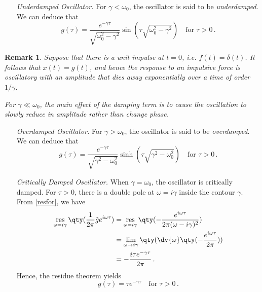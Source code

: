 \documentclass{article}
\theoremstyle{plain}\theoremheaderfont{\normalfont\itshape}\theorembodyfont{\rmfamily}\theoremseparator{.}\newtheorem*{rem}{Remark}\newtheorem*{ex}{Example}\newtheorem*{proof}{Proof}\newtheorem*{altp}{Alternative proof}
\theoremstyle{plain}\theoremheaderfont{\normalfont\bfseries}\theorembodyfont{\rmfamily}\theoremseparator{.}\newtheorem{thm}{Theorem}[section]\newtheorem{lem}[thm]{Lemma}\newtheorem{prop}[thm]{Proposition}\newtheorem*{cor}{Corollary}\newtheorem{defn}[thm]{Definition}\newtheorem{clm}[thm]{Claim}\newtheorem{clminproof}{Claim}
\theoremstyle{break}\theoremheaderfont{\normalfont\itshape}\theorembodyfont{\rmfamily}\theoremseparator{.\medskip}\newtheorem*{proofskip}{Proof}\newtheorem*{exs}{Examples}\newtheorem*{rems}{Remarks}
\theoremstyle{break}\theoremheaderfont{\normalfont\bfseries}\theorembodyfont{\rmfamily}\theoremseparator{.\medskip}\newtheorem{lemskip}[thm]{Lemma}\newtheorem{defnskip}[thm]{Definition}\newtheorem{propskip}[thm]{Proposition}\newtheorem{thmskip}[thm]{Theorem}
\numberwithin{equation}{section}
\DeclareMathOperator*{\res}{res}
\begin{document}
	\begin{itemize}[topsep=0pt,leftmargin=30pt,itemindent=82pt]
		\item[\textit{Underdamped Oscillator.}] For \(\gamma<\omega_0\), the oscillator is said to be \textit{underdamped}. We can deduce that
		\[g(\tau)=\frac{e^{-\gamma\tau}}{\sqrt{\omega_0^2-\gamma^2}}\sin(\tau\sqrt{\omega_0^2-\gamma^2})\quad\text{for }\tau>0\,.\]
	\end{itemize}
	\begin{rem}
		Suppose that there is a unit impulse at \(t=0\), i.e. \(f(t)=\delta(t)\). It follows that \(x(t)=g(t)\), and hence the response to an impulsive force is oscillatory with an amplitude that dies away exponentially over a time of order \(1/\gamma\).

		For \(\gamma\ll \omega_0\), the main effect of the damping term is to cause the oscillation to slowly reduce in amplitude rather than change phase.
	\end{rem}
	\begin{itemize}[topsep=0pt,leftmargin=30pt,itemindent=77pt]
		\item[\textit{Overdamped Oscillator.}] For \(\gamma>\omega_0\), the oscillator is said to be \textit{overdamped}. We can deduce that
		\[g(\tau)=\frac{e^{-\gamma\tau}}{\sqrt{\gamma^2-\omega_0^2}}\sinh(\tau\sqrt{\gamma^2-\omega_0^2})\quad\text{for }\tau>0\,.\]
	\end{itemize}
	\begin{itemize}[topsep=0pt,leftmargin=30pt,itemindent=103pt]
		\item[\textit{Critically Damped Oscillator.}] When \(\gamma=\omega_0\), the oscillator is critically damped. For \(\tau>0\), there is a double pole at \(\omega=i\gamma\) inside the contour \(\gamma\). From \cref{resfor}, we have
		\begin{align*}
			\res_{\omega=i\gamma}\qty(\frac{1}{2\pi}\tilde{g}e^{i\omega\tau})&=\res_{\omega=i\gamma}\qty(-\frac{e^{i\omega\tau}}{2\pi(\omega-i\gamma)^2})\\
			&=\lim_{\omega\to i\gamma}\qty(\dv{\omega}\qty(-\frac{e^{i\omega\tau}}{2\pi}))\\
			&=-\frac{i\tau e^{-\gamma\tau}}{2\pi}\,.
		\end{align*}
		Hence, the residue theorem yields
		\[g(\tau)=\tau e^{-\gamma\tau}\quad\text{for }\tau>0\,.\]
	\end{itemize}
\end{document}
